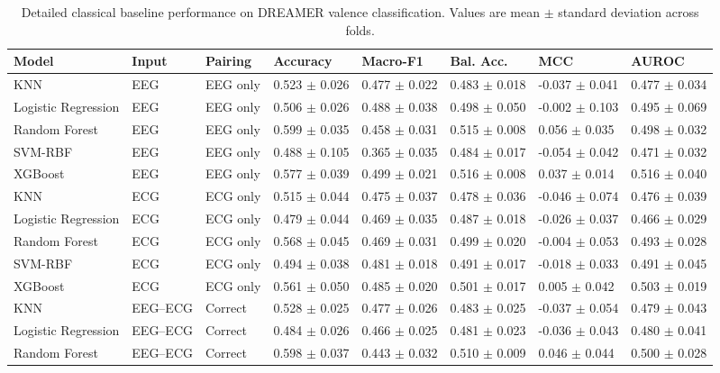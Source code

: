 \begin{table}[!t]
\centering
\caption{Detailed classical baseline performance on DREAMER valence classification. Values are mean $\pm$ standard deviation across folds.}
\label{tab:dreamer_valence_classical_detailed}
\begin{tabular}{llllllll}
\toprule
Model & Input & Pairing & Accuracy & Macro-F1 & Bal. Acc. & MCC & AUROC \\
\midrule
KNN & EEG & EEG only & 0.523 $\pm$ 0.026 & 0.477 $\pm$ 0.022 & 0.483 $\pm$ 0.018 & -0.037 $\pm$ 0.041 & 0.477 $\pm$ 0.034 \\
Logistic Regression & EEG & EEG only & 0.506 $\pm$ 0.026 & 0.488 $\pm$ 0.038 & 0.498 $\pm$ 0.050 & -0.002 $\pm$ 0.103 & 0.495 $\pm$ 0.069 \\
Random Forest & EEG & EEG only & 0.599 $\pm$ 0.035 & 0.458 $\pm$ 0.031 & 0.515 $\pm$ 0.008 & 0.056 $\pm$ 0.035 & 0.498 $\pm$ 0.032 \\
SVM-RBF & EEG & EEG only & 0.488 $\pm$ 0.105 & 0.365 $\pm$ 0.035 & 0.484 $\pm$ 0.017 & -0.054 $\pm$ 0.042 & 0.471 $\pm$ 0.032 \\
XGBoost & EEG & EEG only & 0.577 $\pm$ 0.039 & 0.499 $\pm$ 0.021 & 0.516 $\pm$ 0.008 & 0.037 $\pm$ 0.014 & 0.516 $\pm$ 0.040 \\
KNN & ECG & ECG only & 0.515 $\pm$ 0.044 & 0.475 $\pm$ 0.037 & 0.478 $\pm$ 0.036 & -0.046 $\pm$ 0.074 & 0.476 $\pm$ 0.039 \\
Logistic Regression & ECG & ECG only & 0.479 $\pm$ 0.044 & 0.469 $\pm$ 0.035 & 0.487 $\pm$ 0.018 & -0.026 $\pm$ 0.037 & 0.466 $\pm$ 0.029 \\
Random Forest & ECG & ECG only & 0.568 $\pm$ 0.045 & 0.469 $\pm$ 0.031 & 0.499 $\pm$ 0.020 & -0.004 $\pm$ 0.053 & 0.493 $\pm$ 0.028 \\
SVM-RBF & ECG & ECG only & 0.494 $\pm$ 0.038 & 0.481 $\pm$ 0.018 & 0.491 $\pm$ 0.017 & -0.018 $\pm$ 0.033 & 0.491 $\pm$ 0.045 \\
XGBoost & ECG & ECG only & 0.561 $\pm$ 0.050 & 0.485 $\pm$ 0.020 & 0.501 $\pm$ 0.017 & 0.005 $\pm$ 0.042 & 0.503 $\pm$ 0.019 \\
KNN & EEG--ECG & Correct & 0.528 $\pm$ 0.025 & 0.477 $\pm$ 0.026 & 0.483 $\pm$ 0.025 & -0.037 $\pm$ 0.054 & 0.479 $\pm$ 0.043 \\
Logistic Regression & EEG--ECG & Correct & 0.484 $\pm$ 0.026 & 0.466 $\pm$ 0.025 & 0.481 $\pm$ 0.023 & -0.036 $\pm$ 0.043 & 0.480 $\pm$ 0.041 \\
Random Forest & EEG--ECG & Correct & 0.598 $\pm$ 0.037 & 0.443 $\pm$ 0.032 & 0.510 $\pm$ 0.009 & 0.046 $\pm$ 0.044 & 0.500 $\pm$ 0.028 \\

\end{tabular}
\end{table}
